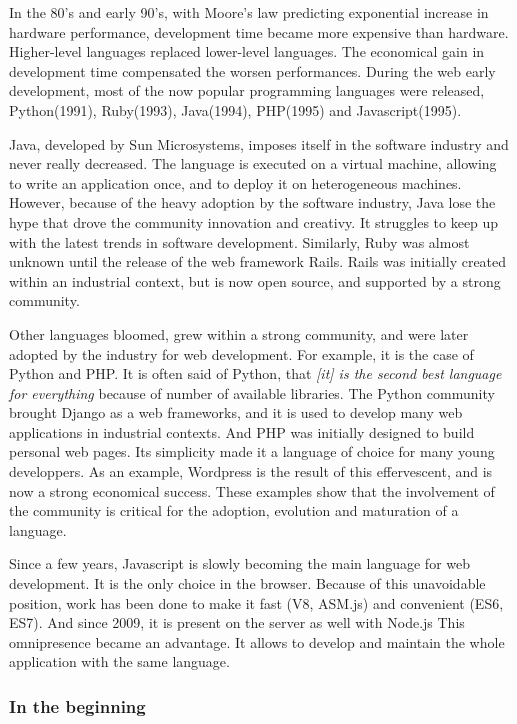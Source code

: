 In the 80's and early 90's, with Moore's law predicting exponential increase in hardware performance, development time became more expensive than hardware.
Higher-level languages replaced lower-level languages.
The economical gain in development time compensated the worsen performances.
During the web early development, most of the now popular programming languages were released, Python(1991), Ruby(1993), Java(1994), PHP(1995) and Javascript(1995).

Java, developed by Sun Microsystems, imposes itself in the software industry and never really decreased.
The language is executed on a virtual machine, allowing to write an application once, and to deploy it on heterogeneous machines.
However, because of the heavy adoption by the software industry, Java lose the hype that drove the community innovation and creativy.
It struggles to keep up with the latest trends in software development.
Similarly, Ruby was almost unknown until the release of the web framework Rails.
Rails was initially created within an industrial context, but is now open source, and supported by a strong community.

Other languages bloomed, grew within a strong community, and were later adopted by the industry for web development.
For example, it is the case of Python and PHP.
It is often said of Python, that \textit{[it] is the second best language for everything} because of number of available libraries.
The Python community brought Django as a web frameworks, and it is used to develop many web applications in industrial contexts.
And PHP was initially designed to build personal web pages.
Its simplicity made it a language of choice for many young developpers.
As an example, Wordpress is the result of this effervescent, and is now a strong economical success.
These examples show that the involvement of the community is critical for the adoption, evolution and maturation of a language.

Since a few years, Javascript is slowly becoming the main language for web development.
It is the only choice in the browser.
Because of this unavoidable position, work has been done to make it fast (V8, ASM.js) and convenient (ES6, ES7).
And since 2009, it is present on the server as well with Node.js
This omnipresence became an advantage.
It allows to develop and maintain the whole application with the same language.

\subsubsection{In the beginning}

